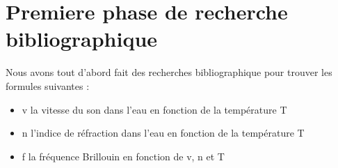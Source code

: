 \documentclass{rapportECC}
\begin{document}

\section{Premiere phase de recherche bibliographique}

Nous avons tout d’abord fait des recherches bibliographique pour trouver les formules suivantes :

\begin{itemize}
    \item v  la vitesse du son dans l’eau en fonction de la température T
    \item n l’indice de réfraction dans l’eau en fonction de la température T
    \item f la fréquence Brillouin en fonction de v, n et T
\end{itemize}
\end{document}
